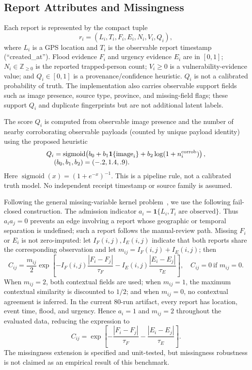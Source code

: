 \documentclass[runningheads]{llncs}
\begin{document}
\subsection{Report Attributes and Missingness}

Each report is represented by the compact tuple
\[
r_i=(L_i,T_i,F_i,E_i,N_i,V_i,Q_i),
\]
where $L_i$ is a GPS location and $T_i$ is the observable report timestamp
(``created\_at''). Flood evidence $F_i$ and urgency evidence $E_i$ are in
$[0,1]$; $N_i\in\mathbb{Z}_{\geq0}$ is the reported trapped-person count;
$V_i\geq0$ is a vulnerability-evidence value; and $Q_i\in[0,1]$ is a
provenance/confidence heuristic. $Q_i$ is not a calibrated probability of
truth. The implementation also carries observable support fields such as
image presence, source type, province, and missing-field flags; these support
$Q_i$ and duplicate fingerprints but are not additional latent labels.

The score $Q_i$ is computed from observable image presence and the number of
nearby corroborating observable payloads (counted by unique payload identity)
using the proposed
heuristic
\[
\begin{aligned}
Q_i&=\operatorname{sigmoid}\!\left(b_0+b_1\mathbf{1}\{\text{image}_i\}
 +b_2\log(1+n_i^{\rm corrob})\right),\\[-1mm]
&(b_0,b_1,b_2)=(-.2,1.4,.9).
\end{aligned}
\]
Here $\operatorname{sigmoid}(x)=(1+e^{-x})^{-1}$. This is a pipeline rule,
not a calibrated truth model. No independent receipt timestamp or source
family is assumed.

Following the general missing-variable kernel problem~\cite{smola2005missing},
we use the following fail-closed construction. The admission indicator
$a_i=\mathbf{1}\{L_i,T_i\text{ are observed}\}$.
Thus $a_i a_j=0$ prevents an edge involving a report whose geographic or
temporal separation is undefined; such a report follows the manual-review
path. Missing $F_i$ or $E_i$ is not zero-imputed: let $I_F(i,j),I_E(i,j)$
indicate that both reports share the corresponding observation and let
$m_{ij}=I_F(i,j)+I_E(i,j)$; then
\[
C_{ij}=\frac{m_{ij}}{2}\exp\!\left[-I_F(i,j)\frac{|F_i-F_j|}{\tau_F}
-I_E(i,j)\frac{|E_i-E_j|}{\tau_E}\right],
\quad C_{ij}=0\ \text{if }m_{ij}=0.
\]
When $m_{ij}=2$, both contextual fields are used; when $m_{ij}=1$, the
maximum contextual similarity is discounted to $1/2$; and when $m_{ij}=0$,
no contextual agreement is inferred. In the current 80-run artifact, every
report has location, event time, flood, and urgency. Hence $a_i=1$ and
$m_{ij}=2$ throughout the evaluated data, reducing the expression to
\[
C_{ij}=\exp\!\left[-\frac{|F_i-F_j|}{\tau_F}
-\frac{|E_i-E_j|}{\tau_E}\right].
\]
The missingness extension is specified and unit-tested, but missingness
robustness is not claimed as an empirical result of this benchmark.
\end{document}
